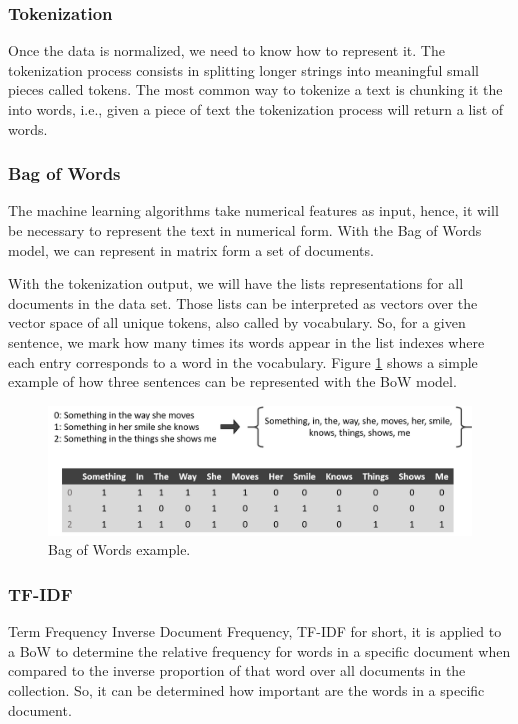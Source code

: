 	\subsubsection{Tokenization}
	Once the data is normalized, we need to know how to represent it. The tokenization process consists in splitting longer strings into meaningful small pieces called tokens. The most common way to tokenize a text is chunking it the into words, i.e., given a piece of text the tokenization process will return a list of words. 
	
	\subsubsection{Bag of Words}
	The machine learning algorithms take numerical features as input, hence, it will be necessary to represent the text in numerical form. With the Bag of Words model, we can represent in matrix form a set of documents.
	
	With the tokenization output, we will have the lists representations for all documents in the data set. Those lists can be interpreted as vectors over the vector space of all unique tokens, also called by vocabulary. So, for a given sentence, we mark how many times its words appear in the list indexes where each entry corresponds to a word in the vocabulary. Figure \ref{fig:bag-of-words} shows a simple example of how three sentences can be represented with the BoW model.
	
	\begin{figure}[h!]
		\centering
		\includegraphics[width=\linewidth]{01.Chapters/02.Background/bag-of-words}
		\caption{Bag of Words example.}
		\label{fig:bag-of-words}
	\end{figure}
	
	\subsubsection{TF-IDF}
	
	Term Frequency Inverse Document Frequency, TF-IDF for short, it is applied to a BoW to determine the relative frequency for words in a specific document when compared to the inverse proportion of that word over all documents in the collection. So, it can be determined how important are the words in a specific document. 
	
